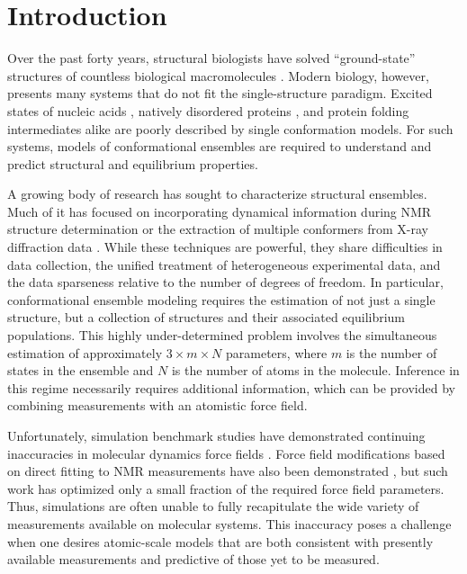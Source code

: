 \documentclass[11pt,titlepage]{article}
\begin{document}
\section*{Introduction}

Over the past forty years, structural biologists have solved ``ground-state'' structures of countless biological macromolecules \citep{Berman2000}. Modern biology, however, presents many systems that do not fit the single-structure paradigm.  Excited states of nucleic acids \citep{dethoff2012}, natively disordered proteins \citep{fink2005}, and protein folding intermediates \citep{korzhnev2004} alike are poorly described by single conformation models.  For such systems, models of conformational ensembles are required to understand and predict structural and equilibrium properties.  

A growing body of research has sought to characterize structural ensembles.  Much of it has focused on incorporating dynamical information during NMR structure determination  \citep{lindorff2005simultaneous, lange2008recognition} or the extraction of multiple conformers from X-ray diffraction data  \citep{depristo2004heterogeneity, lang2010automated}.  While these techniques are powerful, they share difficulties in data collection, the unified treatment of heterogeneous experimental data, and the data sparseness relative to the number of degrees of freedom.  In particular, conformational ensemble modeling requires the estimation of not just a single structure, but a collection of structures and their associated equilibrium populations.  This highly under-determined problem involves the simultaneous estimation of approximately $3 \times m \times N$ parameters, where $m$ is the number of states in the ensemble and $N$ is the number of atoms in the molecule.  Inference in this regime necessarily requires 
additional information, which can be provided by combining measurements with an atomistic force field.  

Unfortunately, simulation benchmark studies have demonstrated continuing inaccuracies in molecular dynamics force fields \citep{best2008, lindorff2012systematic, beauchamp2012protein}.  Force field modifications based on direct fitting to NMR measurements have also been demonstrated \cite{li2011iterative, best2012optimization, nerenberg2011}, but such work has optimized only a small fraction of the required force field parameters.  Thus, simulations are often unable to fully recapitulate the wide variety of measurements available on molecular systems.  This inaccuracy poses a challenge when one desires atomic-scale models that are both consistent with presently available measurements and predictive of those yet to be measured.  
\end{document}
